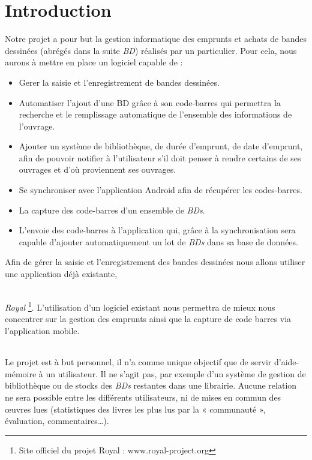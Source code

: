 \part*{Introduction}
Notre projet a pour but la gestion informatique des emprunts et achats de bandes dessinées (abrégés dans la suite \emph{BD}) réalisés par un particulier.
Pour cela, nous aurons à mettre en place un logiciel capable de : 
\begin{itemize}
\item Gerer la saisie et l'enregistrement de bandes dessinées.
\item Automatiser l'ajout d'une BD grâce à son code-barres qui permettra la recherche et le remplissage automatique de l'ensemble des informations de l'ouvrage.
\item Ajouter un système de bibliothèque, de durée d'emprunt, de date d'emprunt, afin de pouvoir notifier à l'utilisateur s'il doit penser à rendre certains de ses ouvrages et d'où proviennent ses ouvrages.
\item Se synchroniser avec l'application Android afin de récupérer les codes-barres.
\end{itemize}

\begin{itemize}
\item La capture des code-barres d'un ensemble de \emph{BDs}.
\item L'envoie des code-barres à l'application qui, grâce à la synchronisation sera capable d'ajouter automatiquement un lot de \emph{BDs} dans sa base de données.
\end{itemize}

Afin de gérer la saisie et l'enregistrement des bandes dessinées nous allons utiliser une application déjà existante, 
\paragraph{}
\emph{Royal} \footnote{Site officiel du projet Royal : www.royal-project.org}. 
L'utilisation d'un logiciel existant nous permettra de mieux nous concentrer sur la gestion des emprunts ainsi que la capture de code barres via l'application mobile.

\paragraph{}
Le projet est à but personnel, il n'a comme unique objectif que de servir d'aide-mémoire à un utilisateur.
Il ne s'agit pas, par exemple d'un système de gestion de bibliothèque ou de stocks des \emph{BDs} restantes dans une librairie.
Aucune relation ne sera possible entre les différents utilisateurs, ni de mises en commun des œuvres lues
(statistiques des livres les plus lus par la « communauté », évaluation, commentaires…).
